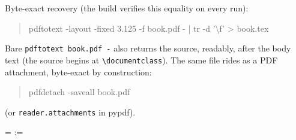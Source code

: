 {{\begin{minipage}{\textwidth}
    \medskip
    \noindent Byte-exact recovery (the build verifies this equality on
    every run):
    \begin{quote}
    \ttfamily pdftotext -layout -fixed 3.125 -f \the\srcl@first{}
    book.pdf - | tr -d '\textbackslash f' > book.tex
    \end{quote}
    \noindent Bare \texttt{pdftotext book.pdf -} also returns the source,
    readably, after the body text (the source begins at
    \texttt{\textbackslash documentclass}). The same file rides as a PDF
    attachment, byte-exact by construction:
    \begin{quote}
    \ttfamily pdfdetach -saveall book.pdf
    \end{quote}
    \noindent (or \texttt{reader.attachments} in pypdf).
    \end{minipage}\par
    \clearpage
    \ifdefined\microtypesetup
    \fi
    \srcl@suspendtagging
    \setlength{\srcl@pagewd}{\dimexpr\srclMaxLineChars\p@*16/5+140pt\relax}%
    \ifdim\srcl@pagewd<\paperwidth\setlength{\srcl@pagewd}{\paperwidth}\fi
    \ifdim\srcl@pagewd>16300pt
      \PackageError{srclayer}{source line too long for one page
        (needs \the\srcl@pagewd)}{Shorten the offending source line, or
        rework the layer.}%
    \fi
    \pagewidth=\srcl@pagewd
    \@for\srcl@f:=\srclChunkFiles{}%
    \srcl@resumetagging
    \fi
    \endgroup
  }{}}

\makeatother
